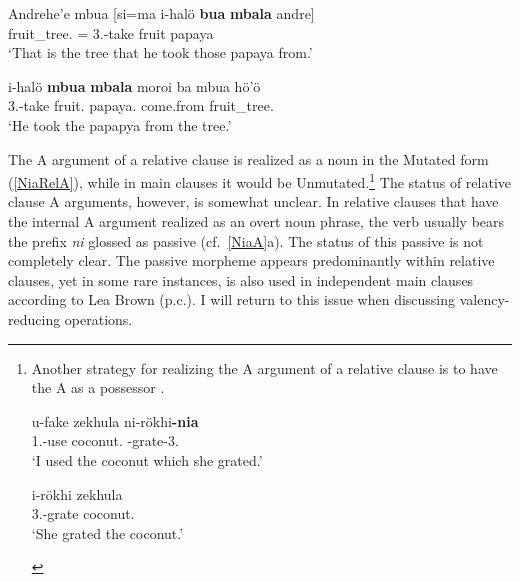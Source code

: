 \begin{exe} \ex\label{NiaRelP2}
\begin{xlist}
\raggedright
\ex \gll Andrehe'e mbua              {\rm[}si=ma i-hal\"o \textbf{bua} \textbf{mbala} {andre}{\rm]}\\
        \dist{}   fruit\_tree.\mut{} \hspaceThis{[}\relativ{}=\pfv{} 3\sg{}.\rls{}-take fruit papaya \dist{}\\
\glt `That is the tree that he took those papaya from.' %

\ex \gll i-hal\"o \textbf{mbua} \textbf{mbala} moroi ba mbua h\"o'\"o\\
3\sg{}.\rls{}-take fruit.\mut{} papaya.\mut{} come.from \loc{} fruit\_tree.\mut{} \dist{}\\
\glt `He took the papapya from the tree.'
\end{xlist}%
\end{exe} 

The A argument of a relative clause is realized as a noun in the Mutated form (\ref{NiaRelA}), while in main clauses it would be Unmutated.\footnote{Another strategy for realizing the A argument of a relative clause is to have the A as a possessor \citep[420]{Brown:2001}. 

\begin{exe}\ex 
\begin{xlist}
\ex\gll u-fake zekhula ni-r\"okhi\textbf{-nia}\\
1\sg{}.\rls{}-use coconut.\mut{} \pass{}-grate-3\sg{}.\poss{}\\
\glt `I used the coconut which she grated.' %

\ex\gll i-r\"okhi zekhula\\
3\sg{}.\rls{}-grate coconut.\mut{}\\
\glt `She grated the coconut.'
\end{xlist} 
\end{exe}}
The status of relative clause A arguments, however, is somewhat unclear. 
In relative clauses that have the internal A argument realized as an overt noun phrase,  the verb usually bears the prefix \emph{ni} glossed as passive (cf.~\ref{NiaA}a). 
The status of this passive is not completely clear. 
The passive morpheme appears predominantly within relative clauses, yet in some rare instances, is also used in independent main clauses according to Lea Brown (p.c.). 
I will return to this issue when discussing valency-reducing operations.

